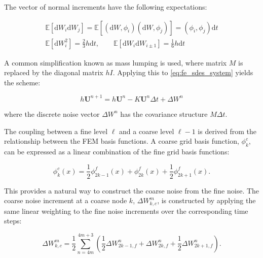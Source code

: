 The vector of normal increments have the following expectations:

\begin{align*}
    \mathbb{E}[\mathrm{d}W_i \mathrm{d}W_j] = \mathbb{E}[(\mathrm{d}W, \phi_i) 
    (\mathrm{d}W, \phi_j)] = (\phi_i, \phi_j)\mathrm{d}t\\
    \mathbb{E}[\mathrm{d}W_i^2] = \frac{2}{3}h \mathrm{d}t, \qquad 
    \mathbb{E}[\mathrm{d}W_i \mathrm{d}W_{i\pm 1}] = \frac{1}{6} h \mathrm{d}t
\end{align*}

A common simplification known as mass lumping is used, where
matrix $M$ is replaced by the diagonal matrix $hI$. 
Applying this to \eqref{eq:fe_sdes_system} yields the scheme:

\begin{equation*}
    h\mathbf{U}^{n+1} = h\mathbf{U}^n - K \mathbf{U}^n \Delta t + \Delta W^n
\end{equation*}

where the discrete noise vector $\Delta W^n$ has the covariance structure 
$M \Delta t$.

The coupling between a fine level $\ell$ and a coarse level $\ell-1$ is derived 
from the relationship between the FEM basis functions. A coarse grid basis 
function, $\phi_k^c$, can be expressed as a linear combination of the fine grid basis functions:

\begin{equation*}
    \phi_k^c(x) = \frac{1}{2} \phi_{2k-1}^f(x) + \phi_{2k}^f(x) + \frac{1}{2}\phi_{2k+1}^f(x).
\end{equation*}

This provides a natural way to construct the coarse noise from the fine noise. The coarse
noise increment at a coarse node $k$, $\Delta W_{k,c}^m$, is constructed by applying the same 
linear weighting to the fine noise increments over the corresponding time steps: 

\begin{equation}\label{eq:fe_coupling_eqn}
    \Delta W_{k,c}^m = \frac{1}{2} \sum_{n=4m}^{4m+3} \left( 
        \frac{1}{2}\Delta W_{2k-1,f}^n + \Delta W_{2k,f}^n + 
        \frac{1}{2}\Delta W_{2k+1,f}^n \right).
\end{equation}
